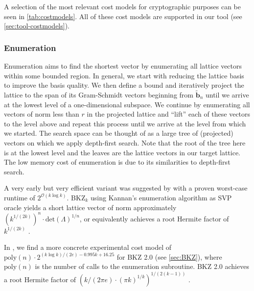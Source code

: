 A selection of the most relevant cost models for cryptographic purposes can be seen in \cref{tab:costmodels}. All of these cost models are supported in our tool (see \cref{sec:tool-costmodels}).


\subsubsection{Enumeration} \label{sec:enumeration}%
Enumeration aims to find the shortest vector by enumerating all lattice vectors within some bounded region. In general, we start with reducing the lattice basis to improve the basis quality. We then define a bound and iteratively project the lattice to the span of its Gram-Schmidt vectors beginning from $\tilde{\mathbf{b}}_n$ until we arrive at the lowest level of a one-dimensional subspace. We continue by enumerating all vectors of norm less than $r$ in the projected lattice and ``lift'' each of these vectors to the level above and repeat this process until we arrive at the level from which we started. The search space can be thought of as a large tree of (projected) vectors on which we apply depth-first search. Note that the root of the tree here is at the lowest level and the leaves are the lattice vectors in our target lattice. %
The low memory cost of enumeration is due to its similarities to depth-first search.

A very early but very efficient variant was suggested by \citet{Kan83} with a proven worst-case runtime of $2^{\mathcal{O}(k \log k)}$. BKZ$_k$ using Kannan's enumeration algorithm as SVP oracle yields a short lattice vector of norm approximately $\left(k^{1/(2k)}\right)^n\cdot \text{det}(\Lambda)^{1/n}$, or equivalently achieves a root Hermite factor of $k^{1/(2k)}$ \cite{HS07, ABFKSW20}. %

In \cite{ABFKSW20}, we find a more concrete experimental cost model of $\text{poly}(n) \cdot 2^{(k \log k) / (2e)  - 0.995 k + 16.25}$ for BKZ 2.0 (see \cref{sec:BKZ}), where $\text{poly}(n)$ is the number of calls to the enumeration subroutine. BKZ 2.0 achieves a  root Hermite factor of $\left(k / (2\pi e) \cdot (\pi k)^{1/k}\right)^{1 / (2(k-1))}$ \cite{Chen13}.

